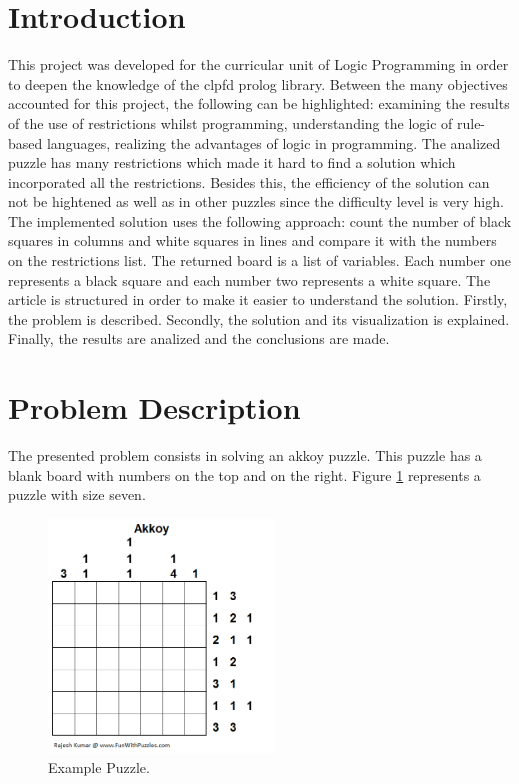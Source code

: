 \documentclass[runningheads,a4paper]{llncs}
\begin{document}
\section{Introduction}

This project was developed for the curricular unit of Logic Programming in order to deepen the knowledge of the clpfd prolog library. Between the many objectives accounted for this project, the following can be highlighted: examining the results of the use of restrictions whilst programming, understanding the logic of rule-based languages, realizing the advantages of logic in programming. The analized puzzle has many restrictions which made it hard to find a solution which incorporated all the restrictions. Besides this, the efficiency of the solution can not be hightened as well as in other puzzles since the difficulty level is very high. The implemented solution uses the following approach: count the number of black squares in columns and white squares in lines and compare it with the numbers on the restrictions list. The returned board is a list of variables. Each number one represents a black square and each number two represents a white square. 
The article is structured in order to make it easier to understand the solution. Firstly, the problem is described. Secondly, the solution and its visualization is explained. Finally, the results are analized and the conclusions are made. 

\section {Problem Description}

The presented problem consists in solving an akkoy puzzle. This puzzle has a blank board with numbers on the top and on the right. Figure \ref{example} represents a puzzle with size seven. 

\begin{figure}
\centering
\includegraphics[height=6.2cm]{puzzleExemplo.png}
\caption{Example Puzzle.}
\label{example}
\end{figure}
\end{document}
